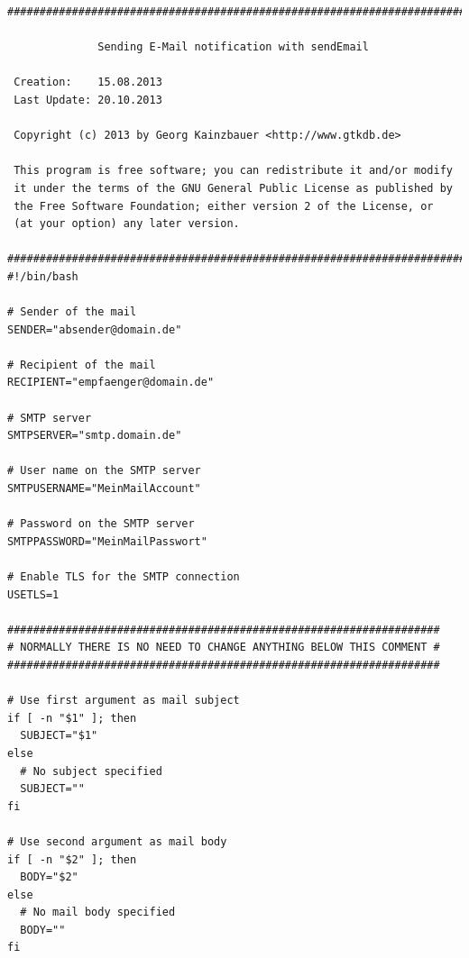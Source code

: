 \documentclass[11pt,a4paper]{article} %
\begin{document}
\begin{frame}

\begin{lstlisting}
###########################################################################
                                                                     												  
              Sending E-Mail notification with sendEmail              									 
                                                                      											 
 Creation:    15.08.2013                                              										 
 Last Update: 20.10.2013                                               										 
                                                                       											
 Copyright (c) 2013 by Georg Kainzbauer <http://www.gtkdb.de>          							
                                                                      											 
 This program is free software; you can redistribute it and/or modify 								 
 it under the terms of the GNU General Public License as published by								  
 the Free Software Foundation; either version 2 of the License, or    								 
 (at your option) any later version.                                   									
                                                                       											
###########################################################################
#!/bin/bash

# Sender of the mail
SENDER="absender@domain.de"

# Recipient of the mail
RECIPIENT="empfaenger@domain.de"

# SMTP server
SMTPSERVER="smtp.domain.de"

# User name on the SMTP server
SMTPUSERNAME="MeinMailAccount"

# Password on the SMTP server
SMTPPASSWORD="MeinMailPasswort"

# Enable TLS for the SMTP connection
USETLS=1

###################################################################
# NORMALLY THERE IS NO NEED TO CHANGE ANYTHING BELOW THIS COMMENT #
###################################################################

# Use first argument as mail subject
if [ -n "$1" ]; then
  SUBJECT="$1"
else
  # No subject specified
  SUBJECT=""
fi

# Use second argument as mail body
if [ -n "$2" ]; then
  BODY="$2"
else
  # No mail body specified
  BODY=""
fi


\end{lstlisting}
\end{frame}
\end{document}
